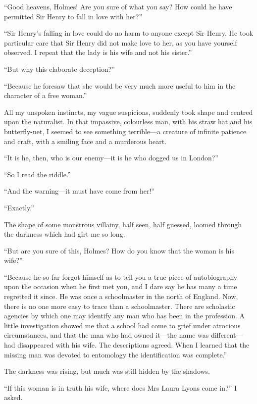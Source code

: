 \documentclass[paper=a5,BCOR=7mm,twoside,DIV=calc,12pt,usegeometry,openany,chapterprefix,endperiod,headings=big]{scrbook} %
\begin{document}
\enquote{Good heavens, Holmes! Are you sure of what you say? How could he have permitted Sir Henry to fall in love with her?}

\enquote{Sir Henry's falling in love could do no harm to anyone except Sir Henry. He took particular care that Sir Henry did not make love to her, as you have yourself observed. I repeat that the lady is his wife and not his sister.}

\enquote{But why this elaborate deception?}

\enquote{Because he foresaw that she would be very much more useful to him in the character of a free woman.}

All my unspoken instincts, my vague suspicions, suddenly took shape and centred upon the naturalist. In that impassive, colourless man, with his straw hat and his butterfly-net, I seemed to see something terrible---a creature of infinite patience and craft, with a smiling face and a murderous heart.

\enquote{It is he, then, who is our enemy---it is he who dogged us in London?}

\enquote{So I read the riddle.}

\enquote{And the warning---it must have come from her!}

\enquote{Exactly.}

The shape of some monstrous villainy, half seen, half guessed, loomed through the darkness which had girt me so long.

\enquote{But are you sure of this, Holmes? How do you know that the woman is his wife?}

\enquote{Because he so far forgot himself as to tell you a true piece of autobiography upon the occasion when he first met you, and I dare say he has many a time regretted it since. He was once a schoolmaster in the north of England. Now, there is no one more easy to trace than a schoolmaster. There are scholastic agencies by which one may identify any man who has been in the profession. A little investigation showed me that a school had come to grief under atrocious circumstances, and that the man who had owned it---the name was different---had disappeared with his wife. The descriptions agreed. When I learned that the missing man was devoted to entomology the identification was complete.}

The darkness was rising, but much was still hidden by the shadows.

\enquote{If this woman is in truth his wife, where does Mrs Laura Lyons come in?} I asked.
\end{document}
